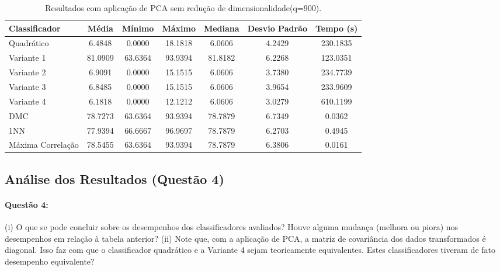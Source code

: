 \documentclass[a4paper, 12pt]{article}
\begin{document}
\begin{table}[H]
    \centering
    \caption{Resultados com aplicação de PCA sem redução de dimensionalidade(q=900).}
    \label{tab:pca_sem_reducao}
    \begin{tabular}{lcccccc}
        \toprule
        \textbf{Classificador} & \textbf{Média} & \textbf{Mínimo} & \textbf{Máximo} & \textbf{Mediana} & \textbf{Desvio Padrão} & \textbf{Tempo (s)} \\
        \midrule
        Quadrático         & 6.4848   & 0.0000   & 18.1818  & 6.0606   & 4.2429         & 230.1835\\
        Variante 1         & 81.0909  & 63.6364  & 93.9394  & 81.8182  & 6.2268         & 123.0351\\
        Variante 2         & 6.9091   & 0.0000   & 15.1515  & 6.0606   & 3.7380         & 234.7739\\
        Variante 3         & 6.8485   & 0.0000   & 15.1515  & 6.0606   & 3.9654         & 233.9609\\
        Variante 4         & 6.1818   & 0.0000   & 12.1212  & 6.0606   & 3.0279         & 610.1199\\
        DMC                & 78.7273  & 63.6364  & 93.9394  & 78.7879  & 6.7349         & 0.0362\\
        1NN                & 77.9394  & 66.6667  & 96.9697  & 78.7879  & 6.2703         & 0.4945\\
        Máxima Correlação  & 78.5455  & 63.6364  & 93.9394  & 78.7879  & 6.3806         & 0.0161\\
        \bottomrule
    \end{tabular}
\end{table}

\subsection*{Análise dos Resultados (Questão 4)}
\paragraph{Questão 4:} (i) O que se pode concluir sobre os desempenhos dos classificadores avaliados? Houve alguma mudança (melhora ou piora) nos desempenhos em relação à tabela anterior? (ii) Note que, com a aplicação de PCA, a matriz de covariância dos dados transformados é diagonal. Isso faz com que o classificador quadrático e a Variante 4 sejam teoricamente equivalentes. Estes classificadores tiveram de fato desempenho equivalente?
\end{document}
